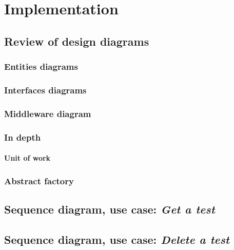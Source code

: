 \chapter{Implementation}

\section{Review of design diagrams}
\subsection{Entities diagrams}
\subsection{Interfaces diagrams}
\subsection{Middleware diagram}
\subsection{In depth}
\subsubsection{Unit of work}
\subsection{Abstract factory}
\section{Sequence diagram, use case: \textit{Get a test}}
\section{Sequence diagram, use case: \textit{Delete a test}}